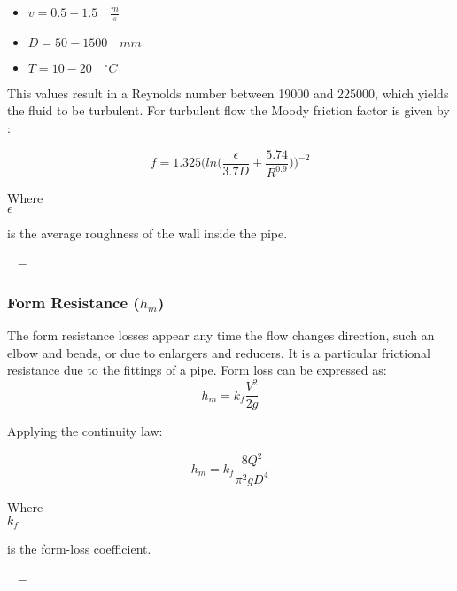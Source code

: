 \begin{itemize}
  \item $v = 0.5 - 1.5  \quad \frac{m}{s}$
  \item $D = 50 - 1500\quad mm$
  \item $T = 10 - 20 \quad ^{\circ} C$
\end{itemize}

This values result in a Reynolds number between 19000 and 225000, which yields the fluid to be turbulent. For turbulent flow the 
Moody friction factor is given by \cite{Design_Water} : 

\begin{equation}
  f = 1.325 \bigg(ln\bigg(\frac{\epsilon}{3.7 D}+\frac{5.74}{R^{0.9}}\bigg)\bigg)^{-2}
  \label{turbulent}
\end{equation}

\begin{minipage}[t]{0.20\textwidth}
Where\\
\hspace*{8mm} $\epsilon$ 
\end{minipage}
\begin{minipage}[t]{0.68\textwidth}
\vspace*{2mm}
is the average roughness of the wall inside the pipe.
 \end{minipage}
\begin{minipage}[t]{0.10\textwidth}
\vspace*{2mm}
\textcolor{White}{te}$\unit{-}$
\end{minipage}

%
\subsubsection{Form Resistance ($h_m$)} 
The form resistance losses appear any time the flow changes direction, such an elbow and bends,
or due to enlargers and reducers. It is a particular frictional resistance due to the 
fittings of a pipe. Form loss can be expressed as:
\begin{equation}
  h_m = k_f \frac{V^2}{2g}
\end{equation}

Applying the continuity law:

\begin{equation}
  h_m = k_f \frac{8Q^2}{\pi^2gD^4}
  \label{Formloss}
\end{equation}

 \begin{minipage}[t]{0.20\textwidth}
Where\\
\hspace*{8mm} $k_f$ 
\end{minipage}
\begin{minipage}[t]{0.68\textwidth}
\vspace*{2mm}
is the form-loss coefficient.  
 \end{minipage}
\begin{minipage}[t]{0.10\textwidth}
\vspace*{2mm}
\textcolor{White}{te}$\unit{-}$
\end{minipage}


